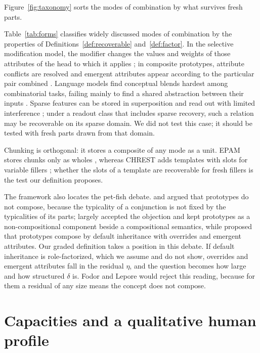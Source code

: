 \documentclass[10pt]{article}
\theoremstyle{plain}
\theoremstyle{remark}
\begin{document}
Figure~\ref{fig:taxonomy} sorts the modes of combination by what survives fresh parts.

Table~\ref{tab:forms} classifies widely discussed modes of combination by the properties of Definitions~\ref{def:recoverable} and~\ref{def:factor}. In the selective modification model, the modifier changes the values and weights of those attributes of the head to which it applies \citep{smith1988}; in composite prototypes, attribute conflicts are resolved and emergent attributes appear according to the particular pair combined \citep{hampton1987}. Language models find conceptual blends hardest among combinatorial tasks, failing mainly to find a shared abstraction between their inputs \citep{schapiro2025}. Sparse features can be stored in superposition and read out with limited interference \citep{elhage2022}; under a readout class that includes sparse recovery, such a relation may be recoverable on its sparse domain. We did not test this case; it should be tested with fresh parts drawn from that domain.

\noindent
Chunking is orthogonal: it stores a composite of any mode as a unit. EPAM stores chunks only as wholes \citep{feigenbaum1984}, whereas CHREST adds templates with slots for variable fillers \citep{gobet1996templates,gobet2000}; whether the slots of a template are recoverable for fresh fillers is the test our definition proposes.

The framework also locates the pet-fish debate. \citet{osherson1981} and \citet{fodor1996} argued that prototypes do not compose, because the typicality of a conjunction is not fixed by the typicalities of its parts; \citet{kamp1995} largely accepted the objection and kept prototypes as a non-compositional component beside a compositional semantics, while \citet{hampton1987,hampton2012} proposed that prototypes compose by default inheritance with overrides and emergent attributes. Our graded definition takes a position in this debate. If default inheritance is role-factorized, which we assume and do not show, overrides and emergent attributes fall in the residual $\eta$, and the question becomes how large and how structured $\delta$ is. Fodor and Lepore would reject this reading, because for them a residual of any size means the concept does not compose.

\section{Capacities and a qualitative human profile}
\label{app:cases}
\end{document}
